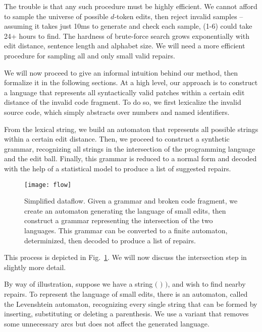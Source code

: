 \documentclass[sigplan,acmsmall,nonacm,screen]{acmart}\settopmatter{printfolios=false,printccs=false,printacmref=false}
\begin{document}
  The trouble is that any such procedure must be highly efficient. We cannot afford to sample the universe of possible $d$-token edits, then reject invalid samples -- assuming it takes just 10ms to generate and check each sample, (1-6) could take 24+ hours to find. The hardness of brute-force search grows exponentially with edit distance, sentence length and alphabet size. We will need a more efficient procedure for sampling all and only small valid repairs.

  We will now proceed to give an informal intuition behind our method, then formalize it in the following sections. At a high level, our approach is to construct a language that represents all syntactically valid patches within a certain edit distance of the invalid code fragment. To do so, we first lexicalize the invalid source code, which simply abstracts over numbers and named identifiers.

  From the lexical string, we build an automaton that represents all possible strings within a certain edit distance. Then, we proceed to construct a synthetic grammar, recognizing all strings in the intersection of the programming language and the edit ball. Finally, this grammar is reduced to a normal form and decoded with the help of a statistical model to produce a list of suggested repairs.

  \begin{figure}[h!]
    \texttt{[image: flow]}\vspace{-1pt}
    \caption{Simplified dataflow. Given a grammar and broken code fragment, we create an automaton generating the language of small edits, then construct a grammar representing the intersection of the two languages. This grammar can be converted to a finite automaton, determinized, then decoded to produce a list of repairs.}\label{fig:arch_simp}
  \end{figure}

  \noindent This process is depicted in Fig.~\ref{fig:arch_simp}. We will now discuss the intersection step in slightly more detail.

  \clearpage

  By way of illustration, suppose we have a string $\texttt{( ) )}$, and wish to find nearby repairs. To represent the language of small edits, there is an automaton, called the Levenshtein automaton, recognizing every single string that can be formed by inserting, substituting or deleting a parenthesis. We use a variant that removes some unnecessary arcs but does not affect the generated language.
\end{document}

